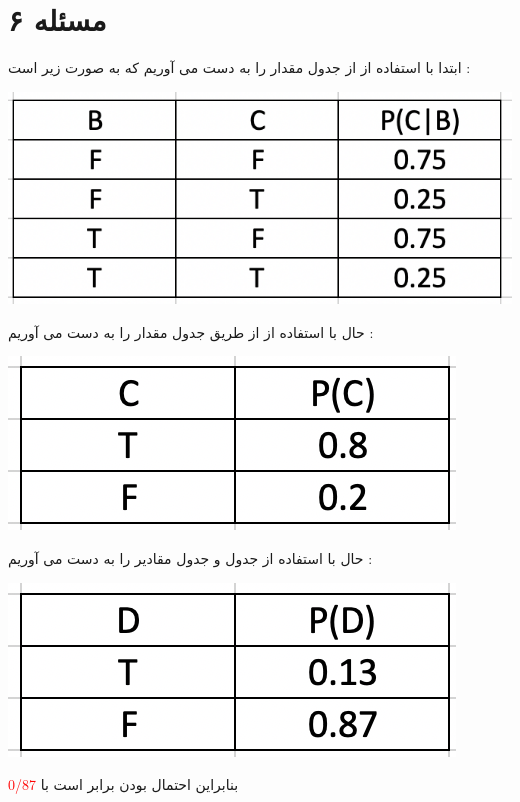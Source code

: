 \documentclass{article}
\begin{document}
\section*{مسئله ۶}
ابتدا با استفاده از 
از جدول 
مقدار 
را به دست می آوریم که به صورت زیر است  : 
\begin{center}
				\includegraphics[width=.3\linewidth]{q6p1} 
\end{center}
حال با استفاده از 
از طریق جدول 
مقدار 
را به دست می آوریم  :
\begin{center}
				\includegraphics[width=.3\linewidth]{q6p2} 
\end{center}
حال با استفاده از جدول 
و جدول 
مقادیر 
را به دست می آوریم  : 
\begin{center}
		\includegraphics[width=.3\linewidth]{q6p3} 
\end{center}
بنابراین احتمال 
بودن 
برابر است با 
\textcolor{red}{0/87}
\end{document}
